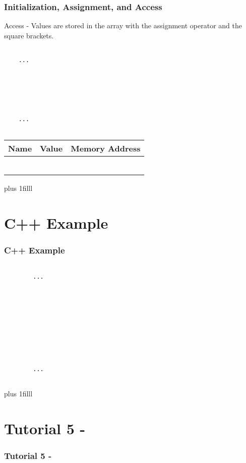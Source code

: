 \documentclass[fleqn]{beamer} %
\newcommand{\sectiontitleIII}{Initialization, Assignment, and Access}
\newcommand{\sectiontitleIV}{C++ Example}
\newcommand{\sectiontitleV}{Tutorial 5 - }
\newcommand{\btVFill}{\vskip0pt plus 1filll}
\begin{document}
\begin{frame}[label=sectionIII,containsverbatim] \small
\frametitle{\sectiontitleIII}

Access - Values are stored in the array with the assignment operator and the square brackets.  \vspace{5mm}\\

\begin{multicols}{2}
	
	\begin{lstlisting}
	
	...
	
	
	
	
	
	
	...			
	
	\end{lstlisting}
	
	\renewcommand*{\arraystretch}{1.5}
	\begin{tabular}{c|c|c} 
		Name&Value&Memory Address\\ \hline
		& & \\ \hline
		& & \\ \hline
		& & \\ \hline
		& & \\ \hline
		& & \\ \hline
		& & \\ \hline
	\end{tabular}
	
	
	
\end{multicols}

\btVFill


\end{frame}

\section{\sectiontitleIV}	
	\begin{frame}[label=sectionIV,containsverbatim] \small
		\frametitle{\sectiontitleIV}    
	
		\begin{lstlisting}
		
		...
		
		
		
		
		
		
		
		
		
		
		...			
		
		\end{lstlisting}
		

		\btVFill
	\end{frame}

\section{\sectiontitleV}	
	\begin{frame}[label=sectionV,containsverbatim] \small
	\frametitle{\sectiontitleV}    
	

	\end{frame}
\end{document}
